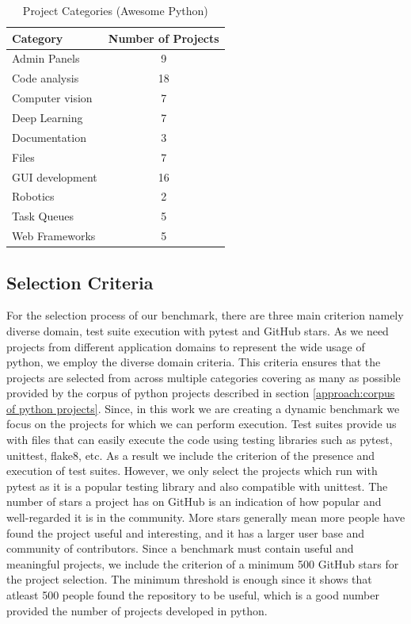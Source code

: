 \begin{table}[ht]
    \centering
    \begin{tabular}{lc}
    \hline
    \textbf{Category} & \textbf{Number of Projects}\\
    \hline
    Admin Panels    & 9\\
    Code analysis   & 18\\
    Computer vision & 7\\
    Deep Learning   & 7\\
    Documentation   & 3\\
    Files   & 7\\
    GUI development & 16\\
    Robotics    & 2\\
    Task Queues & 5\\
    Web Frameworks  & 5\\
    \hline
    \end{tabular}
    \caption{Project Categories (Awesome Python)}
    \label{table:awesome-python}
\end{table}

\subsection{Selection Criteria}
\label{approach:selection criteria}
For the selection process of our benchmark, there are three main criterion namely diverse domain, test suite execution with pytest and GitHub stars.
As we need projects from different application domains to represent the wide usage of python, we employ the diverse domain criteria.
This criteria ensures that the projects are selected from across multiple categories covering as many as possible provided by the corpus of python projects described in section \ref{approach:corpus of python projects}.
Since, in this work we are creating a dynamic benchmark we focus on the projects for which we can perform execution.
Test suites provide us with files that can easily execute the code using testing libraries such as pytest, unittest, flake8, etc.
As a result we include the criterion of the presence and execution of test suites.
However, we only select the projects which run with pytest as it is a popular testing library and also compatible with unittest. 
The number of stars a project has on GitHub is an indication of how popular and well-regarded it is in the community.
More stars generally mean more people have found the project useful and interesting, and it has a larger user base and community of contributors. \cite{github_stars}
Since a benchmark must contain useful and meaningful projects, we include the criterion of a minimum 500 GitHub stars for the project selection.
The minimum threshold is enough since it shows that atleast 500 people found the repository to be useful, which is a good number provided the number of projects developed in python.

